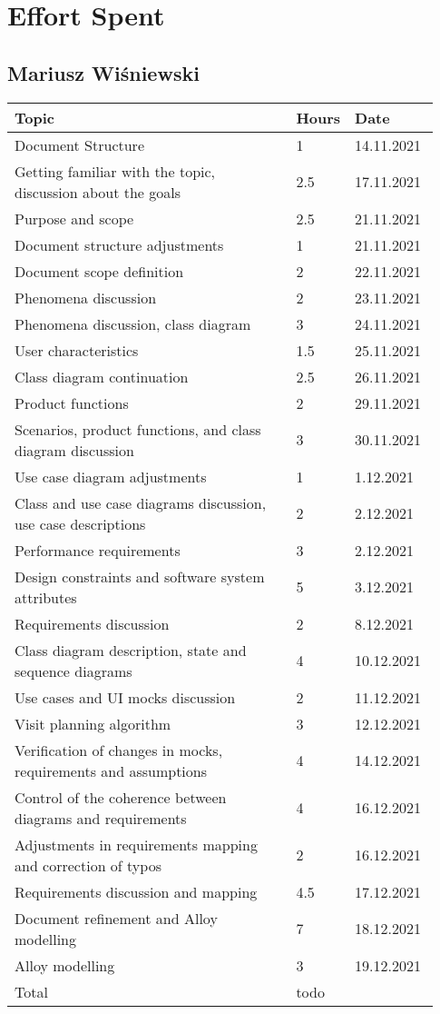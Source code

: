 \chapter{Effort Spent}

\section*{Mariusz Wiśniewski}
\begin{longtable}{@{}p{0.67\linewidth} p{0.06\linewidth} p{0.20\linewidth}@{}}
    \toprule[1.5pt]
    Topic & Hours & Date\\ \hline
    Document Structure & 1 & 14.11.2021\\ 
    Getting familiar with the topic, discussion about the goals & 2.5 & 17.11.2021\\ 
    Purpose and scope & 2.5 & 21.11.2021\\ 
    Document structure adjustments & 1 & 21.11.2021\\
    Document scope definition & 2 & 22.11.2021\\
    Phenomena discussion & 2 & 23.11.2021\\
    Phenomena discussion, class diagram & 3 & 24.11.2021\\ 
    User characteristics & 1.5 & 25.11.2021\\ 
    Class diagram continuation & 2.5 & 26.11.2021 \\ 
    Product functions & 2 & 29.11.2021 \\
    Scenarios, product functions, and class diagram discussion & 3 & 30.11.2021\\
    Use case diagram adjustments & 1 & 1.12.2021\\
    Class and use case diagrams discussion, use case descriptions & 2 & 2.12.2021\\ 
    Performance requirements & 3 & 2.12.2021\\
    Design constraints and software system attributes & 5 & 3.12.2021\\
    Requirements discussion & 2 & 8.12.2021\\
    Class diagram description, state and sequence diagrams & 4 & 10.12.2021\\ 
    Use cases and UI mocks discussion & 2 & 11.12.2021\\
    Visit planning algorithm & 3 & 12.12.2021\\
    Verification of changes in mocks, requirements and assumptions & 4 & 14.12.2021\\
    Control of the coherence between diagrams and requirements & 4 & 16.12.2021\\
    Adjustments in requirements mapping and correction of typos & 2 & 16.12.2021\\
    Requirements discussion and mapping & 4.5 & 17.12.2021\\
    Document refinement and Alloy modelling & 7 & 18.12.2021\\
    Alloy modelling & 3 & 19.12.2021\\
    \hline
    Total & todo &\\ 
    \bottomrule[1.5pt]
\end{longtable}

